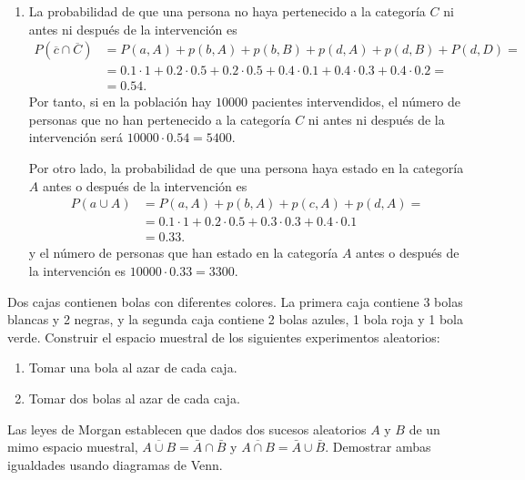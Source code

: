 {\begin{enumerate}
Luego es igualmente probable que proceda de las categorías $c$ o $d$.

\item La probabilidad de que una persona no haya pertenecido a la categoría $C$ ni antes ni después de la intervención es 
\begin{align*}
P(\overline c\cap \overline C) &= P(a,A)+p(b,A)+p(b,B)+p(d,A)+p(d,B)+P(d,D) =\\
& = 0.1 \cdot 1 + 0.2 \cdot 0.5 + 0.2 \cdot 0.5 + 0.4 \cdot 0.1 + 0.4 \cdot 0.3 + 0.4 \cdot 0.2 = \\
& = 0.54.
\end{align*}
Por tanto, si en la población hay $10000$ pacientes intervendidos, el número de personas que no han pertenecido a la categoría $C$
ni antes ni después de la intervención será $10000\cdot 0.54 = 5400$.

Por otro lado, la probabilidad de que una persona haya estado en la categoría $A$ antes o después de la intervención es
\begin{align*}
P(a\cup A) &= P(a,A) + p(b,A) + p(c,A) + p(d,A) =\\
&=   0.1 \cdot 1 +  0.2 \cdot 0.5 +  0.3 \cdot 0.3 +  0.4 \cdot 0.1 \\
&=  0.33.
\end{align*}
y el número de personas que han estado en la categoría $A$ antes o después de la intervención es $10000\cdot 0.33 = 3300$.
\end{enumerate}
}


{Dos cajas contienen bolas con diferentes colores. 
La primera caja contiene 3 bolas blancas y 2 negras, y la segunda caja contiene 2 bolas azules, 1 bola roja y 1 bola verde.
Construir el espacio muestral de los siguientes experimentos aleatorios:
\begin{enumerate}
\item Tomar una bola al azar de cada caja. 
\item Tomar dos bolas al azar de cada caja. 
\end{enumerate}
}
{}
{}


{Las leyes de Morgan establecen que dados dos sucesos aleatorios $A$ y $B$ de un mimo espacio muestral,  $\overline{A\cup B}=\bar A
\cap \bar B$ y $\overline{A\cap B}=\bar A \cup \bar B$.
Demostrar ambas igualdades usando diagramas de Venn.
}
{}
{}


